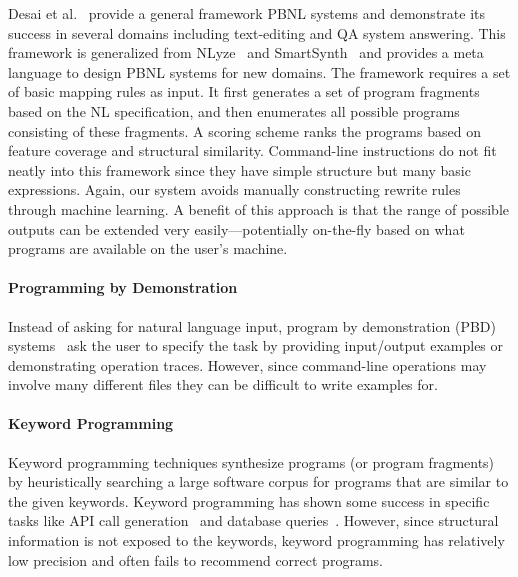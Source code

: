 Desai et al.~\cite{DBLP:journals/corr/DesaiGHJKMRR15} provide a general framework PBNL systems and demonstrate its success in several domains including text-editing and QA system answering. This framework is generalized from NLyze~\cite{DBLP:conf/sigmod/GulwaniM14} and SmartSynth~\cite{DBLP:conf/mobisys/LeGS13} and provides a meta language to design PBNL systems for new domains. The framework requires a set of basic mapping rules as input. It first generates a set of program fragments based on the NL specification, and then enumerates all possible programs consisting of these fragments. A scoring scheme ranks the programs based on feature coverage and structural similarity. Command-line instructions do not fit neatly into this framework since they have simple structure but many basic expressions. Again, our system avoids manually constructing rewrite rules through machine learning. A benefit of this approach is that the range of possible outputs can be extended very easily---potentially on-the-fly based on what programs are available on the user's machine.

\paragraph{Programming by Demonstration} Instead of asking for natural language input, program by demonstration (PBD) systems~\cite{DBLP:journals/ml/LauWDW03, DBLP:journals/cacm/GulwaniHS12, DBLP:conf/pldi/HarrisG11, DBLP:conf/popl/Gulwani11} ask the user to specify the task by providing input/output examples or demonstrating operation traces. However, since command-line operations may involve many different files they can be difficult to write examples for.

\paragraph{Keyword Programming} Keyword programming techniques synthesize programs (or program fragments) by heuristically searching a large software corpus for programs that are similar to the given keywords. Keyword programming has shown some success in specific tasks like API call generation~\cite{DBLP:journals/ase/LittleM09, DBLP:conf/pldi/MandelinXBK05} and database queries~\cite{DBLP:conf/icde/AgrawalCD02, DBLP:conf/icde/BhalotiaHNCS02}. However, since structural information is not exposed to the keywords, keyword programming has relatively low precision and often fails to recommend correct programs.

